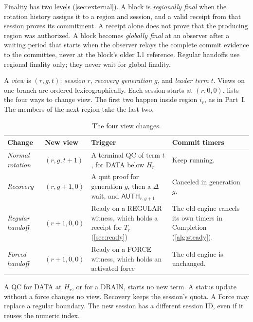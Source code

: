 \documentclass[11pt,a4paper]{article}
\newcommand{\tagg}[1]{\ensuremath{\mathsf{#1}}}
\newcommand{\defterm}[1]{\textcolor{rrBlue}{\textit{#1}}}
\begin{document}
Finality has two levels (\cref{sec:external}). A block is
\defterm{regionally final} when the rotation history assigns it to a region and
session, and a valid receipt from that session proves its commitment. A
receipt alone does not prove that the producing region was authorized.
A block becomes \defterm{globally final} at an observer after a waiting period
that starts when the observer relays the complete commit evidence to the
committee, never at the block's older L1 reference. Regular handoffs use
regional finality only; they never wait for global finality.

A \defterm{view} is $(r,g,t)$: \defterm{session} $r$, \defterm{recovery generation} $g$, and \defterm{leader
term} $t$. Views on one branch are ordered lexicographically. Each session starts at
$(r,0,0)$.  lists the four ways to change view. The
first two happen inside region $i_r$, as in Part~I. The members of the
next region take the last two.

\begin{table}[htbp]\centering\small
\caption{The four view changes.}
\label{tab:views}
\begin{tabularx}{\linewidth}{@{}>{\raggedright\arraybackslash}p{.19\linewidth}>{\raggedright\arraybackslash}p{.12\linewidth}Y>{\raggedright\arraybackslash}p{.23\linewidth}@{}}
\toprule
Change & New view & Trigger & Commit timers\\
\midrule
\defterm{Normal rotation} & $(r,g,t+1)$ & A terminal QC of term $t$, for DATA below $H_r$ & Keep running.\\
\defterm{Recovery} & $(r,g+1,0)$ & A quit proof for generation $g$, then a $\Delta$ wait, and $\tagg{AUTH}_{r,g+1}$ & Canceled in generation $g$.\\
\defterm{Regular handoff} & $(r+1,0,0)$ & Ready on a REGULAR witness, which holds a receipt for $T_r$ (\cref{sec:ready}) & The old engine cancels its own timers in Completion (\cref{alg:steady}).\\
\defterm{Forced handoff} & $(r+1,0,0)$ & Ready on a FORCE witness, which holds an activated force & The old engine is unchanged.\\
\bottomrule
\end{tabularx}
\end{table}
A QC for DATA at $H_r$, or for a DRAIN, starts no new term. A status
update without a force changes no view. Recovery keeps the session's
quota. A Force may replace a regular boundary. The new
session has a different session ID, even if it reuses the numeric
index.
\end{document}
